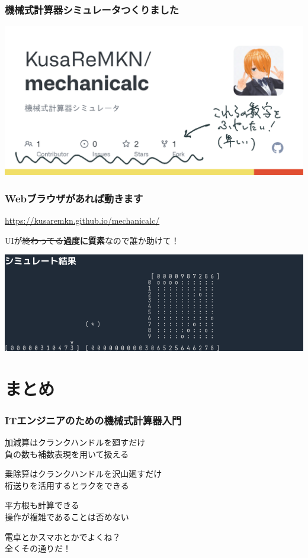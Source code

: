 \documentclass[
  lualatex,
  aspectratio=169,
  fleqn,
  14pt
]{beamer}
\begin{document}
\begin{frame}
  \frametitle{機械式計算器シミュレータ\hspace{1\zw}つくりました}

  \includegraphics[width=\linewidth]{./images/mechanicalc.png}

\end{frame}

\begin{frame}
  \frametitle{Webブラウザがあれば動きます}

  \url{https://kusaremkn.github.io/mechanicalc/}

  UIが\sout{終わってる}\textbf{過度に質素}なので誰か助けて！

  \includegraphics[width=\linewidth]{./images/simulator.png}

\end{frame}

\section*{まとめ}

\begin{frame}
  \frametitle{ITエンジニアのための機械式計算器入門}

  加減算はクランクハンドルを廻すだけ\\
  \hspace{2.5\zw}負の数も補数表現を用いて扱える

  乗除算はクランクハンドルを沢山廻すだけ\\
  \hspace{2.5\zw}桁送りを活用するとラクをできる

  平方根も計算できる\\
  \hspace{2.5\zw}操作が複雑であることは否めない

  \pause
  電卓とかスマホとかでよくね？\\
  \hspace{2.5\zw}全くその通りだ！
\end{frame}
\end{document}
